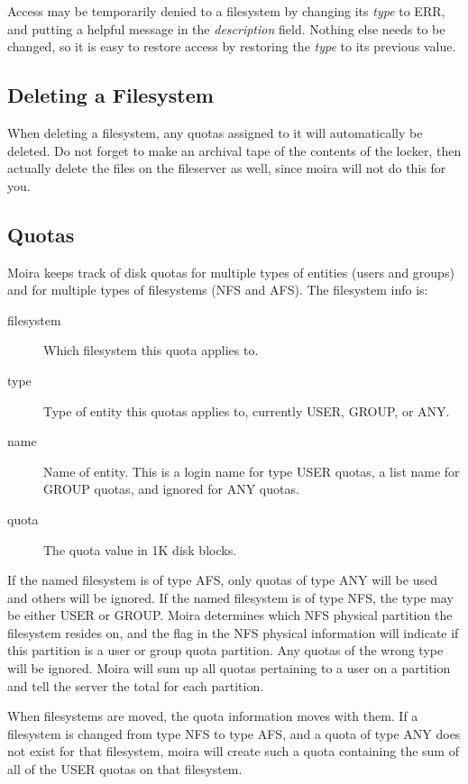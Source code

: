 \documentclass{book}
\begin{document}
Access may be temporarily denied to a filesystem by changing its
{\em type} to ERR, and putting a helpful message in the {\em description}
field.  Nothing else needs to be changed, so it is easy to restore
access by restoring the {\em type} to its previous value.

\subsection{Deleting a Filesystem}

When deleting a filesystem, any quotas assigned to it will
automatically be deleted.  Do not forget to make an archival tape of
the contents of the locker, then actually delete the files on the
fileserver as well, since moira will not do this for you.

\subsection{Quotas}

Moira keeps track of disk quotas for multiple types of entities (users
and groups) and for multiple types of filesystems (NFS and AFS).  The
filesystem info is:
\begin{description}
\item[filesystem] Which filesystem this quota applies to.
\item[type] Type of entity this quotas applies to, currently USER, GROUP, or
ANY. 
\item[name] Name of entity.  This is a login name for type USER quotas, a
list name for GROUP quotas, and ignored for ANY quotas.
\item[quota] The quota value in 1K disk blocks.
\end{description}

 If the named filesystem is of type AFS, only quotas of
type ANY will be used and others will be ignored.   If the
named filesystem is of type NFS, the type may be either USER or GROUP.
Moira determines which NFS physical partition the filesystem resides
on, and the flag in the NFS physical information will indicate if this
partition is a user or group quota partition.  Any quotas of the wrong
type will be ignored.  Moira will sum up all quotas pertaining to a
user on a partition and tell the server the total for each partition.

When filesystems are moved, the quota information moves with them.  If
a filesystem is changed from type NFS to type AFS, and a quota of type
ANY does not exist for that filesystem, moira will create such a quota
containing the sum of all of the USER quotas on that filesystem.
\end{document}
